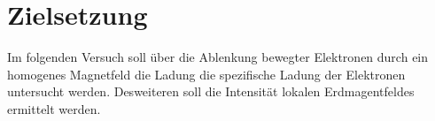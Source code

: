 \section{Zielsetzung}
\label{sec:Zielsetzung}

Im folgenden Versuch soll über die Ablenkung bewegter Elektronen durch ein homogenes Magnetfeld die Ladung die spezifische
Ladung der Elektronen untersucht werden. Desweiteren soll die Intensität lokalen Erdmagentfeldes ermittelt werden.